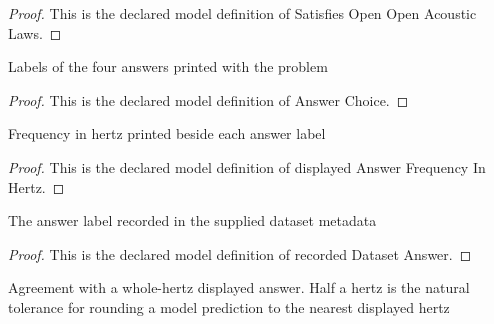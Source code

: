\begin{proof}
  This is the declared model definition of Satisfies Open Open Acoustic Laws.
\end{proof}
\begin{definition}
  \label{def:physics:phyx-mini-0224:phyxminiproblems-problemphyxmini0224-answerchoice}
  Labels of the four answers printed with the problem
\end{definition}
\begin{proof}
  This is the declared model definition of Answer Choice.
\end{proof}
\begin{definition}
  \label{def:physics:phyx-mini-0224:phyxminiproblems-problemphyxmini0224-displayedanswerfrequencyinhertz}
  Frequency in hertz printed beside each answer label
\end{definition}
\begin{proof}
  This is the declared model definition of displayed Answer Frequency In Hertz.
\end{proof}
\begin{definition}
  \label{def:physics:phyx-mini-0224:phyxminiproblems-problemphyxmini0224-recordeddatasetanswer}
  The answer label recorded in the supplied dataset metadata
\end{definition}
\begin{proof}
  This is the declared model definition of recorded Dataset Answer.
\end{proof}
\begin{definition}
  \label{def:physics:phyx-mini-0224:phyxminiproblems-problemphyxmini0224-matchesanswerchoice}
  Agreement with a whole-hertz displayed answer. Half a hertz is the natural tolerance for rounding a model prediction to the nearest displayed hertz
\end{definition}
